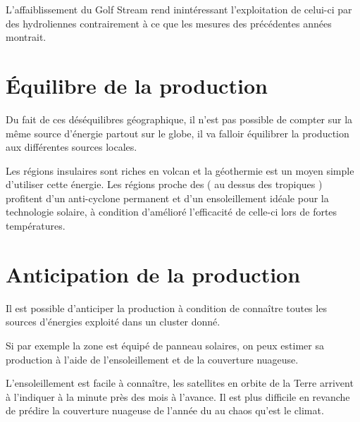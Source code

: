 L'affaiblissement du Golf Stream rend inintéressant l'exploitation de celui-ci par des hydroliennes contrairement
à ce que les mesures des précédentes années montrait.


\section{Équilibre de la production}

Du fait de ces déséquilibres géographique, il n'est pas possible de compter sur la même source d'énergie partout
sur le globe, il va falloir équilibrer la production aux différentes sources locales.

Les régions insulaires sont riches en volcan et la géothermie est un moyen simple d'utiliser cette énergie.
Les régions proche des ( au dessus des tropiques ) profitent d'un anti-cyclone permanent et d'un ensoleillement
idéale pour la technologie solaire, à condition d'amélioré l'efficacité de celle-ci lors de fortes températures.

\section{Anticipation de la production}

Il est possible d'anticiper la production à condition de connaître toutes les sources d'énergies
exploité dans un cluster donné.

Si par exemple la zone est équipé de panneau solaires, on peux estimer sa production à l'aide de
l'ensoleillement et de la couverture nuageuse.

L'ensoleillement est facile à connaître, les satellites en orbite de la Terre arrivent à l'indiquer à la minute près
des mois à l'avance.
Il est plus difficile en revanche de prédire la couverture nuageuse de l'année du au chaos qu'est le climat.
